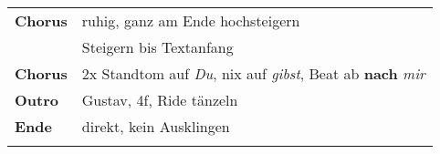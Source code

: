 \begin{tabular}{p{1.6cm}l}
	\textbf{Chorus} & ruhig, ganz am Ende hochsteigern                                          \\
	                & Steigern bis Textanfang                                                   \\
	\textbf{Chorus} & 2x Standtom auf \textit{Du}, nix auf \textit{gibst}, Beat ab \textbf{nach} \textit{mir} \\
	\textbf{Outro}  & Gustav, 4f, Ride tänzeln                                                  \\
	\textbf{Ende}   & direkt, kein Ausklingen                                                   \\
	                &                                                                           \\
\end{tabular}

